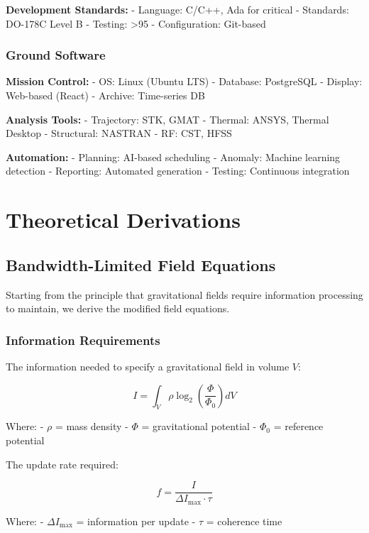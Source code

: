 \documentclass[12pt,letterpaper]{book}
\theoremstyle{definition}
\theoremstyle{plain}
\theoremstyle{remark}
\begin{document}
{{{{{\textbf{Development Standards:}
- Language: C/C++, Ada for critical
- Standards: DO-178C Level B
- Testing: >95%
- Configuration: Git-based

\subsection{Ground Software}

\textbf{Mission Control:}
- OS: Linux (Ubuntu LTS)
- Database: PostgreSQL
- Display: Web-based (React)
- Archive: Time-series DB

\textbf{Analysis Tools:}
- Trajectory: STK, GMAT
- Thermal: ANSYS, Thermal Desktop
- Structural: NASTRAN
- RF: CST, HFSS

\textbf{Automation:}
- Planning: AI-based scheduling
- Anomaly: Machine learning detection
- Reporting: Automated generation
- Testing: Continuous integration

\chapter{Theoretical Derivations}

\section{Bandwidth-Limited Field Equations}

Starting from the principle that gravitational fields require information processing to maintain, we derive the modified field equations.

\subsection{Information Requirements}

The information needed to specify a gravitational field in volume $V$:

\begin{equation}
I = \int_V \rho \log_2\left(\frac{\Phi}{\Phi_0}\right) dV
\end{equation}

Where:
- $\rho$ = mass density
- $\Phi$ = gravitational potential
- $\Phi_0$ = reference potential

The update rate required:

\begin{equation}
f = \frac{I}{\Delta I_{\max} \cdot \tau}
\end{equation}

Where:
- $\Delta I_{\max}$ = information per update
- $\tau$ = coherence time

}}}}}
\end{document}
